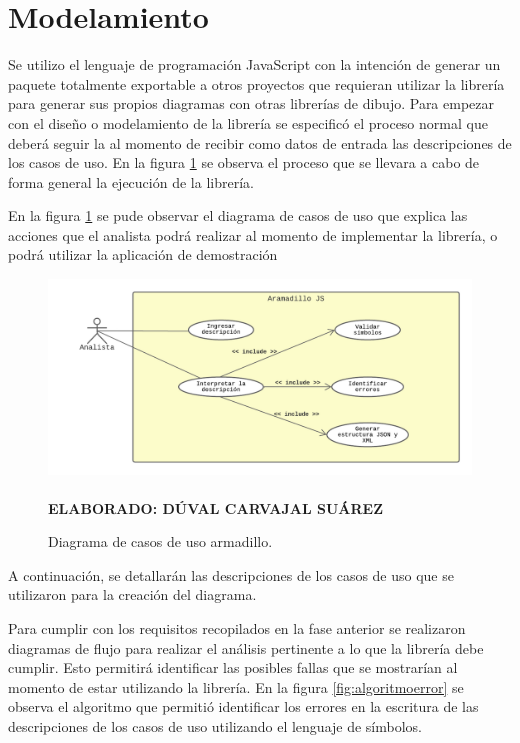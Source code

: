 \section{Modelamiento}

Se utilizo el lenguaje de programación JavaScript con la intención de generar un paquete totalmente exportable a otros proyectos que requieran utilizar la librería para generar sus propios diagramas con otras librerías de dibujo. Para empezar con el diseño o modelamiento de la librería se especificó el proceso normal que deberá seguir la al momento de recibir como datos de entrada las descripciones de los casos de uso. En la figura \ref{fig:armadillocasodeuso} se observa el proceso que se llevara a cabo de forma general la ejecución de la librería.

En la figura \ref{fig:armadillocasodeuso} se pude observar el diagrama de casos de uso que explica las acciones que el analista podrá realizar al momento de implementar la librería, o podrá utilizar la aplicación de demostración


\begin{figure}[h!]
	\caption{Diagrama de casos de uso armadillo.}
	\includegraphics[width=15cm]{img/modelamientocasodeuso.png}
	\label{fig:armadillocasodeuso}
	\textbf{\\ \\ ELABORADO: DÚVAL CARVAJAL SUÁREZ}
\end{figure} 

A continuación, se detallarán las descripciones de los casos de uso que se utilizaron para la creación del diagrama.

Para cumplir con los requisitos recopilados en la fase anterior se realizaron diagramas de flujo para realizar el análisis pertinente a lo que la librería debe cumplir. Esto permitirá identificar las posibles fallas que se mostrarían al momento de estar utilizando la librería. En la figura \ref{fig:algoritmoerror} se observa el algoritmo que permitió identificar los errores en la escritura de las descripciones de los casos de uso utilizando el lenguaje de símbolos.


